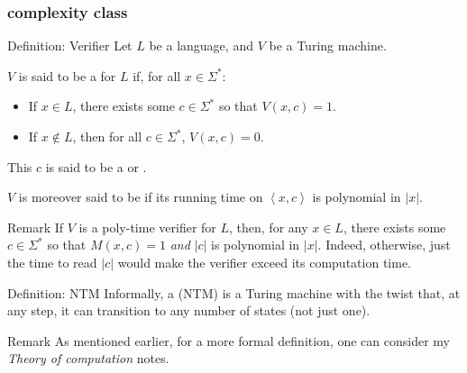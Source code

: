 \documentclass[a4paper]{article}
\begin{document}
\subsubsection{ complexity class}

\begin{parag}{Definition: Verifier}
    Let $L$ be a language, and $V$ be a Turing machine.

    $V$ is said to be a  for $L$ if, for all $x \in \Sigma^*$:
    \begin{itemize}
        \item If $x \in L$, there exists some $c \in \Sigma^*$ so that $V\left(x, c\right) = 1$.
        \item If $x \not \in L$, then for all $c \in \Sigma^*$, $V\left(x, c\right) = 0$.
    \end{itemize}
    
    This $c$ is said to be a  or .

    $V$ is moreover said to be  if its running time on $\left\langle x, c \right\rangle$ is polynomial in $\left|x\right|$.

    \begin{subparag}{Remark}
        If $V$ is a poly-time verifier for $L$, then, for any $x \in L$, there exists some $c \in \Sigma^*$ so that $M\left(x, c\right) = 1$ \textit{and} $\left|c\right|$ is polynomial in $\left|x\right|$. Indeed, otherwise, just the time to read $\left|c\right|$ would make the verifier exceed its computation time.
    \end{subparag}
\end{parag}

\begin{parag}{Definition: NTM}
    Informally, a  (NTM) is a Turing machine with the twist that, at any step, it can transition to any number of states (not just one).

    \begin{subparag}{Remark}
        As mentioned earlier, for a more formal definition, one can consider my \textit{Theory of computation} notes.
    \end{subparag}
\end{parag}
\end{document}
